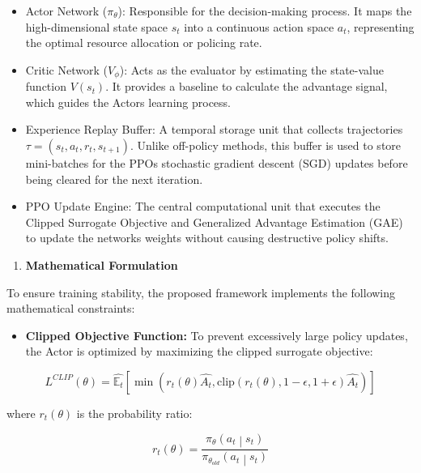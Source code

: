 \begin{itemize}
\item
  Actor Network (\(\pi_{\theta}\)): Responsible for the decision-making process. It maps the high-dimensional state space \(s_{t}\) into a continuous action space \(a_{t}\), representing the optimal resource allocation or policing rate.
\item
  Critic Network (\(V_{\phi}\)): Acts as the evaluator by estimating the state-value function \(V\left( s_{t} \right)\). It provides a baseline to calculate the advantage signal, which guides the Actor\textquotesingle s learning process.
\item
  Experience Replay Buffer: A temporal storage unit that collects trajectories \(\tau = \left( s_{t},a_{t},r_{t},s_{t + 1} \right)\). Unlike off-policy methods, this buffer is used to store mini-batches for the PPO\textquotesingle s stochastic gradient descent (SGD) updates before being cleared for the next iteration.
\item
  PPO Update Engine: The central computational unit that executes the Clipped Surrogate Objective and Generalized Advantage Estimation (GAE) to update the networks\textquotesingle{} weights without causing destructive policy shifts.
\end{itemize}

\begin{enumerate}
\def\labelenumi{\arabic{enumi})}
\item
  \textbf{Mathematical Formulation}
\end{enumerate}

To ensure training stability, the proposed framework implements the following mathematical constraints:

\begin{itemize}
\item
  \textbf{Clipped Objective Function:} To prevent excessively large policy updates, the Actor is optimized by maximizing the clipped surrogate objective:
\end{itemize}

\begin{equation}\label{eq:13}
L^{CLIP}(\theta) = \widehat{\mathbb{E}_{t}}\left\lbrack \min\left( r_{t}(\theta)\widehat{A_{t}},\text{clip}\left( r_{t}(\theta),1 - \epsilon,1 + \epsilon \right)\widehat{A_{t}} \right) \right\rbrack
\end{equation}

where \(r_{t}(\theta)\) is the probability ratio:

\begin{equation}\label{eq:14}
r_{t}(\theta) = \frac{\pi_{\theta}\left( a_{t} \middle| s_{t} \right)}{\pi_{\theta_{old}}\left( a_{t} \middle| s_{t} \right)}
\end{equation}

